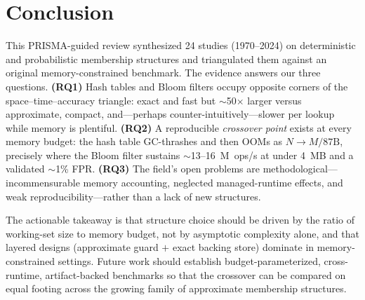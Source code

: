 \documentclass[conference]{IEEEtran}
\begin{document}
\section{Conclusion}
This PRISMA-guided review synthesized 24 studies (1970--2024) on deterministic
and probabilistic membership structures and triangulated them against an
original memory-constrained benchmark. The evidence answers our three
questions. \textbf{(RQ1)} Hash tables and Bloom filters occupy opposite corners
of the space--time--accuracy triangle: exact and fast but $\sim$50$\times$
larger versus approximate, compact, and---perhaps counter-intuitively---slower
per lookup while memory is plentiful. \textbf{(RQ2)} A reproducible
\emph{crossover point} exists at every memory budget: the hash table
GC-thrashes and then OOMs as $N \to M/87\text{B}$, precisely where the Bloom
filter sustains $\sim$13--16~M~ops/s at under 4~MB and a validated $\sim$1\%
FPR. \textbf{(RQ3)} The field's open problems are methodological---
incommensurable memory accounting, neglected managed-runtime effects, and weak
reproducibility---rather than a lack of new structures.

The actionable takeaway is that structure choice should be driven by the ratio
of working-set size to memory budget, not by asymptotic complexity alone, and
that layered designs (approximate guard $+$ exact backing store) dominate in
memory-constrained settings. Future work should establish budget-parameterized,
cross-runtime, artifact-backed benchmarks so that the crossover can be compared
on equal footing across the growing family of approximate membership
structures.
\end{document}
